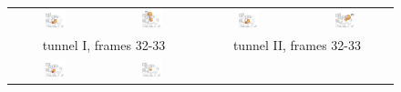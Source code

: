 \documentclass[usletter, 10pt, conference]{svjour3}      %
\begin{document}
\begin{figure}
\centering
{
\renewcommand{\tabcolsep}{0pt}
\begin{tabular}{cccc}
\includegraphics[width=0.24\textwidth]{fig/framed-0033-001-0032} & 
\includegraphics[width=0.24\textwidth]{fig/framed-0033-002-0033label} &
\includegraphics[width=0.24\textwidth]{fig/framed-0033-002-0032} & 
\includegraphics[width=0.24\textwidth]{fig/framed-0033-001-0033label} \\
\multicolumn{2}{c}{tunnel I, frames 32-33} &
\multicolumn{2}{c}{tunnel II, frames 32-33} \\
\includegraphics[width=0.24\textwidth]{fig/framed-0053-000-0049} &
\includegraphics[width=0.24\textwidth]{fig/framed-0053-000-0050} &

\end{tabular}}
\end{figure}
\end{document}
